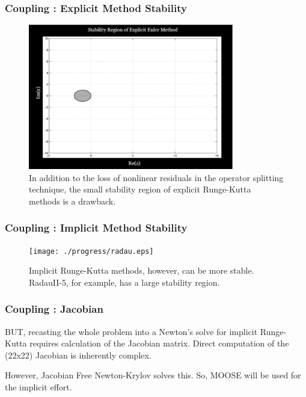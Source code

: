 \begin{frame}[fragile]
  \frametitle{Coupling : Explicit Method Stability}
  \begin{figure}[htbp!]
    \begin{center}
      \includegraphics[width=0.8\textwidth]{./progress/euler.eps}
    \end{center}
    \caption{In addition to the loss of nonlinear residuals in the operator 
    splitting technique, the small stability region of explicit Runge-Kutta methods is 
  a drawback.}
    \label{fig:euler_stability}
  \end{figure}

\end{frame}

\begin{frame}[fragile]
  \frametitle{Coupling : Implicit Method Stability}
  \begin{figure}[htbp!]
    \begin{center}
      \texttt{[image: ./progress/radau.eps]}
    \end{center}
    \caption{Implicit Runge-Kutta methods, however, can be more stable. RadauII-5, for example, has a large stability region.}
    \label{fig:radau_stability}
  \end{figure}

\end{frame}


\begin{frame}[fragile]
  \frametitle{Coupling : Jacobian}
BUT, recasting the whole problem into a Newton's solve for implicit Runge-Kutta
requires calculation of the Jacobian matrix. Direct computation of the (22x22)
Jacobian is inherently complex. 

However, Jacobian Free Newton-Krylov solves this. So, MOOSE will be used for
the implicit effort.

\end{frame}

